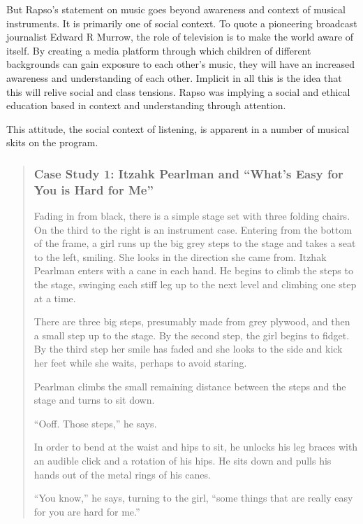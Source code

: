 \documentclass[12pt,letterpaper]{article}
\begin{document}
	But Rapso's statement on music goes beyond awareness and context of 
	musical instruments. It is primarily one of social context. To quote 
	a pioneering broadcast journalist Edward R Murrow,
	the role of television is to make the world aware of
	itself.\autocite[54]{Davis} By creating a media platform through which 
	children of different backgrounds can gain exposure to each other's 
	music, they
	will have an increased awareness and understanding of each other.
	Implicit in all this is the idea that this will relive social and class
	tensions. Rapso was implying a social and ethical education based in
	context and understanding through attention. 


	This attitude, the social context of listening, is apparent in a number 
	of musical skits on the program.  


	\begin{quote}
	\subsubsection*{Case Study 1: Itzahk Pearlman and ``What's Easy for You
	 is Hard for Me''}

	Fading in from black, there is a simple stage set with three folding 
	chairs. On the third to the right is an instrument case. Entering from 
	the bottom of the frame, a girl runs up the big grey steps to the stage 
	and takes a seat to the left, smiling. She looks in the direction she 
	came from. Itzhak Pearlman enters with a cane in each hand. He begins 
	to climb the steps to the stage, swinging each stiff leg up to the next
	level and climbing one step at a time. 

	There are three big steps, presumably made from grey plywood, and then a
	small step up to the stage. By the second step, the girl begins to 
	fidget. By the third step her smile has faded and she looks to the side
	and kick her feet while she waits, perhaps to avoid staring.   

	Pearlman climbs the small remaining distance between the steps and the 
	stage and turns to sit down. 

	``Ooff. Those steps,'' he says.

	In order to bend at the waist and hips to sit, he unlocks his leg 
	braces with an audible click and a rotation of his hips. He sits down 
	and pulls his hands out of the metal rings of his canes.

	``You know,'' he says, turning to the girl, ``some things that are 
	really easy for you are hard for me.''


\end{quote}
\end{document}
